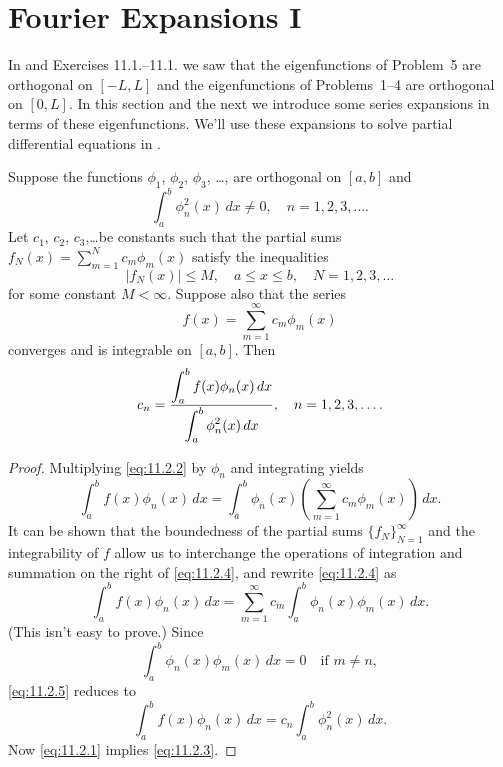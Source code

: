 \section{Fourier Expansions I}\label{sec:fourier_i}

In  and
{Exercises 11.1.}--{11.1.} we saw
that the
  eigenfunctions of Problem~5 are orthogonal on $[-L,L]$ and the
eigenfunctions of Problems~1--4 are orthogonal on $[0,L]$.
In this section and the next we introduce some series expansions
in terms of these eigenfunctions.
We'll use these expansions  to solve partial differential equations in
.


\begin{theorem}\label{thmtype:11.2.1}
Suppose the functions  $\phi_1$, $\phi_2$,
$\phi_3$, \dots, are orthogonal on $[a,b]$ and
\begin{equation} \label{eq:11.2.1}
\int_a^b\phi_n^2(x)\,dx\ne0,\quad n=1,2,3,\dots.
\end{equation}
Let $c_1$, $c_2$, $c_3$,\dots  be constants such that the partial sums
$f_N(x)=\sum_{m=1}^N c_m\phi_m(x)$ satisfy the inequalities
\[
|f_N(x)|\le M,\quad a\le x\le b,\quad N=1,2,3,\dots
\]
for some constant $M<\infty$. Suppose  also that
the series
\begin{equation} \label{eq:11.2.2}
f(x)=\sum_{m=1}^\infty c_m\phi_m(x)
\end{equation}
converges and is integrable on $[a,b]$.
Then
\begin{equation} \label{eq:11.2.3}
c_n=\frac{\displaystyle\int_a^bf(x)\phi_n(x)\,dx}{\displaystyle\int_a^b\phi_n^2(x)\,dx},\quad
n=1,2,3,\dots.
\end{equation}
\end{theorem}

\begin{proof}
Multiplying \eqref{eq:11.2.2} by $\phi_n$ and
integrating yields
\begin{equation} \label{eq:11.2.4}
\int_a^b f(x)\phi_n(x)\,dx=\int_a^b
\phi_n(x)\left(\sum_{m=1}^\infty c_m\phi_m(x)\right)\,dx.
\end{equation}
It can be shown that the
 boundedness of the partial sums
$\{f_N\}_{N=1}^\infty$ and the integrability of $f$
allow us to interchange the operations of integration and summation
on the right of \eqref{eq:11.2.4}, and rewrite \eqref{eq:11.2.4} as
\begin{equation} \label{eq:11.2.5}
\int_a^b f(x)\phi_n(x)\,dx=\sum_{m=1}^\infty c_m
\int_a^b\phi_n(x) \phi_m(x)\,dx.
\end{equation}
(This isn't  easy to prove.) Since
\[
\int_a^b\phi_n(x)\phi_m(x)\,dx=0\quad\text{if }m\ne n,
\]
\eqref{eq:11.2.5} reduces to
\[
\int_a^bf(x) \phi_n(x)\,dx=c_n\int_a^b\phi_n^2(x)\,dx.
\]
Now  \eqref{eq:11.2.1} implies \eqref{eq:11.2.3}.
\end{proof}


